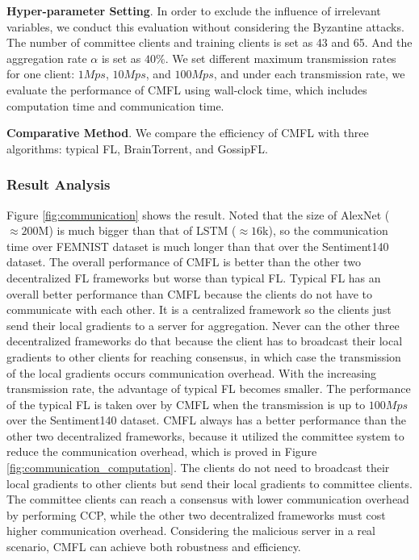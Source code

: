 \documentclass[10pt,journal,compsoc]{IEEEtran}
\begin{document}
\textbf{Hyper-parameter Setting}. In order to exclude the influence of irrelevant variables, we conduct this evaluation without considering the Byzantine attacks. The number of committee clients and training clients is set as 43 and 65. And the aggregation rate $\alpha$ is set as $40\%$. We set different maximum transmission rates for one client: $1Mps$, $10Mps$, and $100Mps$, and under each transmission rate, we evaluate the performance of CMFL using wall-clock time, which includes computation time and communication time. 

\textbf{Comparative Method}. We compare the efficiency of CMFL with three algorithms: typical FL, BrainTorrent\cite{DBLP:journals/corr/abs-1905-06731}, and GossipFL\cite{DBLP:journals/corr/abs-1908-07782}.

\subsubsection{Result Analysis}
{
Figure \ref{fig:communication} shows the result. Noted that the size of AlexNet ($\approx 200$M) is much bigger than that of LSTM ($\approx 16$k), so the communication time over FEMNIST dataset is much longer than that over the Sentiment140 dataset. The overall performance of CMFL is better than the other two decentralized FL frameworks but worse than typical FL. Typical FL has an overall better performance than CMFL because the clients do not have to communicate with each other. It is a centralized framework so the clients just send their local gradients to a server for aggregation. Never can the other three decentralized frameworks do that because the client has to broadcast their local gradients to other clients for reaching consensus, in which case the transmission of the local gradients occurs communication overhead. With the increasing transmission rate, the advantage of typical FL becomes smaller. The performance of the typical FL is taken over by CMFL when the transmission is up to $100Mps$ over the Sentiment140 dataset. CMFL always has a better performance than the other two decentralized frameworks, because it utilized the committee system to reduce the communication overhead, which is proved in Figure \ref{fig:communication_computation}. The clients do not need to broadcast their local gradients to other clients but send their local gradients to committee clients. The committee clients can reach a consensus with lower communication overhead by performing CCP, while the other two decentralized frameworks must cost higher communication overhead. Considering the malicious server in a real scenario, CMFL can achieve both robustness and efficiency. 
}
\end{document}

